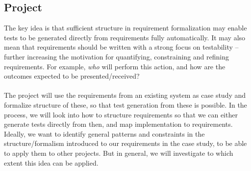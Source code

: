 \documentclass[10pt]{scrartcl}
\begin{document}
\subsection*{Project}
The key idea is that sufficient structure in requirement formalization
may enable tests to be generated directly from requirements fully
automatically. It may also mean that requirements should be written with
a strong focus on testability -- further increasing the motivation for
quantifying, constraining and refining requirements. For example,
\emph{who} will perform this action, and how are the outcomes expected
to be presented/received?\\\\
The project will use the requirements from an existing system as case
study and formalize structure of these, so that test generation from
these is possible. In the process, we will look into how to structure
requirements so that we can either generate tests directly from then,
and map implementation to requirements. Ideally, we want to identify
general patterns and constraints in the structure/formalism introduced
to our requirements in the case study, to be able to apply them to other
projects. But in general, we will investigate to which extent this idea
can be applied.
\end{document}

